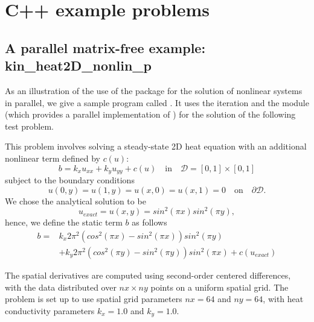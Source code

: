 \section{C++ example problems}\label{s:ex_cpp}

\subsection{A parallel matrix-free example: kin\_heat2D\_nonlin\_p}\label{ss:kin_heat2D_nonlin_p}

As an illustration of the use of the {\kinsol} package for the
solution of nonlinear systems in parallel, 
we give a sample program called .
It uses the {\kinsol}  iteration 
and the {\nvecp} module (which provides a parallel implementation of {\nvector})
for the solution of the following test problem.

This problem involves solving a steady-state 2D heat equation with an additional
nonlinear term defined by $c(u)$:
\begin{equation}
    b = k_x u_{xx} + k_y u_{yy} + c(u) \quad \text{in} \quad \mathcal{D}
        = [0,1] \times [0,1]
\end{equation}
subject to the boundary conditions
\begin{equation}
    u(0,y) = u(1,y) = u(x,0) = u(x,1) = 0 \quad \text{on} \quad \partial \mathcal{D}.
\end{equation}
We chose the analytical solution to be
\begin{equation}
    u_{exact} = u(x,y) = sin^2(\pi x) sin^2(\pi y),
\end{equation}
hence, we define the static term $b$ as follows
\begin{equation}
\begin{aligned}
    b = &k_x 2 \pi^2 (cos^2(\pi x) - sin^2(\pi x)) sin^2(\pi y) \\
        &+ k_y 2 \pi^2 (cos^2(\pi y) - sin^2(\pi y)) sin^2(\pi x) + c(u_{exact})
\end{aligned}
\end{equation}

The spatial derivatives are computed using second-order centered
differences, with the data distributed over $nx\times ny$ points
on a uniform spatial grid.  
The problem is set up to use spatial grid parameters $nx=64$ and
$ny=64$, with heat conductivity parameters $k_x=1.0$ and
$k_y=1.0$.  

